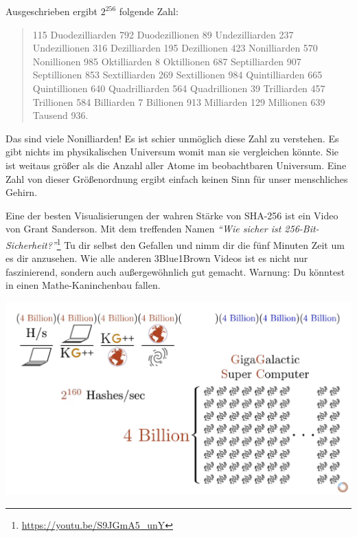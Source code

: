 Ausgeschrieben ergibt $2^{256}$ folgende Zahl:

\begin{quotation}\begin{samepage}
    115 Duodezilliarden 792 Duodezillionen 89 Undezilliarden 237 Undezillionen
    316 Dezilliarden 195 Dezillionen 423 Nonilliarden 570 Nonillionen 985
    Oktilliarden 8 Oktillionen 687 Septilliarden 907 Septillionen 853
    Sextilliarden 269 Sextillionen 984 Quintilliarden 665 Quintillionen 640
    Quadrilliarden 564 Quadrillionen 39 Trilliarden 457 Trillionen 584
    Billiarden 7 Billionen 913 Milliarden 129 Millionen 639 Tausend 936.
\end{samepage}\end{quotation}

Das sind viele Nonilliarden! Es ist schier unmöglich diese Zahl zu verstehen. Es
gibt nichts im physikalischen Universum womit man sie vergleichen könnte. Sie
ist weitaus größer als die Anzahl aller Atome im beobachtbaren Universum. Eine
Zahl von dieser Größenordnung ergibt einfach keinen Sinn für unser menschliches
Gehirn.

Eine der besten Visualisierungen der wahren Stärke von SHA-256 ist ein  Video
von Grant Sanderson. Mit dem treffenden Namen \textit{\enquote{Wie sicher ist
256-Bit-Sicherheit?}}\footnote{\url{https://youtu.be/S9JGmA5_unY}} Tu dir selbst
den Gefallen und nimm dir die fünf Minuten Zeit um es dir anzusehen. Wie alle
anderen 3Blue1Brown Videos ist es nicht nur faszinierend, sondern auch
außergewöhnlich gut gemacht. Warnung: Du könntest in einen Mathe-Kaninchenbau
fallen.

\begin{center}
  \includegraphics[width=\textwidth]{assets/images/youtube-vid-inverted.png}
  \label{fig:youtube-vid-inverted}
\end{center}

